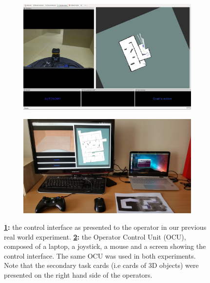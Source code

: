 \documentclass[a4paper,12pt,oneside,openright]{bhamthesis}
\begin{document}
\begin{figure}
		\centering
		\begin{subfigure}[b]{0.48\textwidth}
			\centering
			\includegraphics[width=\textwidth]{chapter4_fig/interface_real.png}
			\caption{}
			\label{subfig:interface_real_exp2}
		\end{subfigure}
		\hfill
		\begin{subfigure}[b]{0.495\textwidth}
			\centering
			\includegraphics[width=\textwidth]{chapter4_fig/OCU.jpg}
			\caption{}
			\label{subfig:OCU_exp2}
		\end{subfigure}
		\hfill
		\caption{ \textbf{\ref{subfig:interface_real_exp2}:} the control interface as presented to the operator in our previous real world experiment. \textbf{\ref{subfig:OCU_exp2}:} the Operator Control Unit (OCU), composed of a laptop, a joystick, a mouse and a screen showing the control interface. The same OCU was used in both experiments. Note that the secondary task cards (i.e cards of 3D objects) were presented on the right hand side of the operators.}
		\label{fig:various_real_exp2}
	\end{figure}
\end{document}
